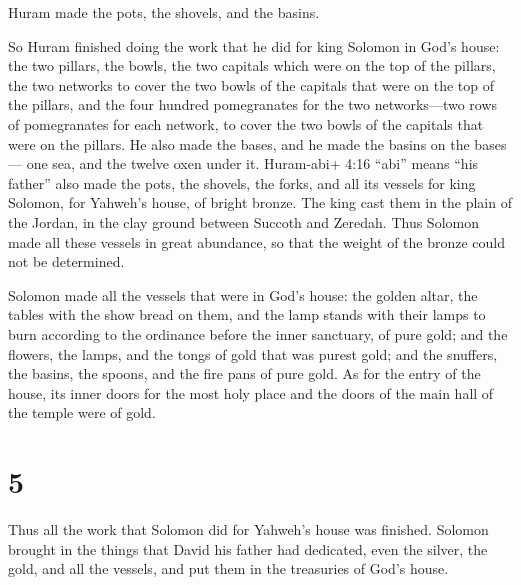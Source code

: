  Huram made the pots, the shovels, and the basins.

So Huram finished doing the work that he did for king Solomon in God's
house:  the two pillars, the bowls, the two capitals which
were on the top of the pillars, the two networks to cover the two bowls
of the capitals that were on the top of the pillars,  and
the four hundred pomegranates for the two networks---two rows of
pomegranates for each network, to cover the two bowls of the capitals
that were on the pillars.  He also made the bases, and he
made the basins on the bases---  one sea, and the twelve
oxen under it.  Huram-abi+ 4:16 ``abi'' means ``his
father'' also made the pots, the shovels, the forks, and all its vessels
for king Solomon, for Yahweh's house, of bright bronze. 
The king cast them in the plain of the Jordan, in the clay ground
between Succoth and Zeredah.  Thus Solomon made all these
vessels in great abundance, so that the weight of the bronze could not
be determined.

 Solomon made all the vessels that were in God's house: the
golden altar, the tables with the show bread on them,  and
the lamp stands with their lamps to burn according to the ordinance
before the inner sanctuary, of pure gold;  and the flowers,
the lamps, and the tongs of gold that was purest gold;  and
the snuffers, the basins, the spoons, and the fire pans of pure gold. As
for the entry of the house, its inner doors for the most holy place and
the doors of the main hall of the temple were of gold.

\hypertarget{section-4}{%
\section{5}\label{section-4}}

 Thus all the work that Solomon did for Yahweh's house was
finished. Solomon brought in the things that David his father had
dedicated, even the silver, the gold, and all the vessels, and put them
in the treasuries of God's house.

